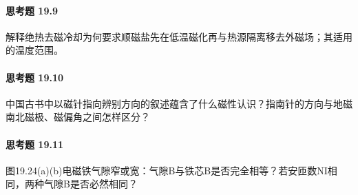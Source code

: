 \paragraph{思考题 19.9}
解释绝热去磁冷却为何要求顺磁盐先在低温磁化再与热源隔离移去外磁场；其适用的温度范围。

\paragraph{思考题 19.10}
中国古书中以磁针指向辨别方向的叙述蕴含了什么磁性认识？指南针的方向与地磁南北磁极、磁偏角之间怎样区分？

\paragraph{思考题 19.11}
图19.24(a)(b)电磁铁气隙窄或宽：气隙B与铁芯B是否完全相等？若安匝数NI相同，两种气隙B是否必然相同？
